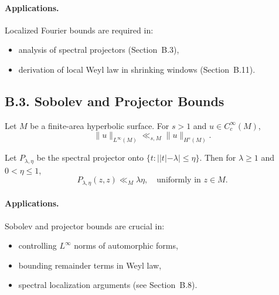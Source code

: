 \paragraph{Applications.}
Localized Fourier bounds are required in:
\begin{itemize}
  \item analysis of spectral projectors (Section~B.3),
  \item derivation of local Weyl law in shrinking windows (Section~B.11).
\end{itemize}



%
\subsection*{B.3. Sobolev and Projector Bounds}

\begin{lemma}\label{lem:B3}
Let $M$ be a finite-area hyperbolic surface. For $s>1$ and $u \in C_c^\infty(M)$,
\begin{equation}
  \|u\|_{L^\infty(M)} \ll_{s,M} \|u\|_{H^s(M)}.
\end{equation}
\end{lemma}

\begin{proposition}\label{prop:B3}
Let $P_{\lambda,\eta}$ be the spectral projector onto 
$\{t: ||t|-\lambda|\leq \eta\}$. Then for $\lambda \geq 1$ and $0<\eta\leq 1$,
\begin{equation}
  P_{\lambda,\eta}(z,z) \ll_{M} \lambda \eta,
  \quad \text{uniformly in } z\in M.
\end{equation}
\end{proposition}

\paragraph{Applications.}
Sobolev and projector bounds are crucial in:
\begin{itemize}
  \item controlling $L^\infty$ norms of automorphic forms,
  \item bounding remainder terms in Weyl law,
  \item spectral localization arguments (see Section~B.8).
\end{itemize}

